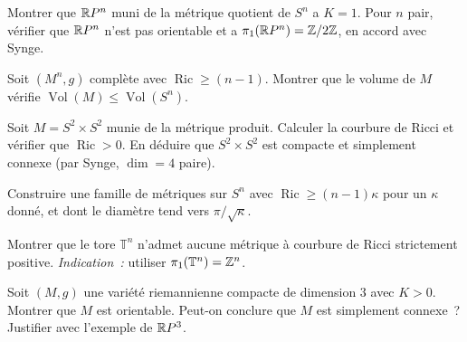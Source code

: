 \begin{exercice}
Montrer que $\mathbb{R} P^n$ muni de la m\'etrique quotient de $S^n$ a $K = 1$. Pour $n$
pair, v\'erifier que $\mathbb{R} P^n$ n'est pas orientable et a $\pi_1(\mathbb{R} P^n) = \mathbb{Z}/2\mathbb{Z}$,
en accord avec Synge.
\end{exercice}

\begin{exercice}
Soit $(M^n, g)$ compl\`ete avec $\operatorname{Ric} \geq (n-1)$. Montrer que
le volume de $M$ v\'erifie $\operatorname{Vol}(M) \leq \operatorname{Vol}(S^n)$.
\end{exercice}

\begin{exercice}
Soit $M = S^2 \times S^2$ munie de la m\'etrique produit. Calculer la courbure de
Ricci et v\'erifier que $\operatorname{Ric} > 0$. En d\'eduire que $S^2 \times S^2$
est compacte et simplement connexe (par Synge, $\dim = 4$ paire).
\end{exercice}

\begin{exercice}
Construire une famille de m\'etriques sur $S^n$ avec $\operatorname{Ric} \geq (n-1)\kappa$
pour un $\kappa$ donn\'e, et dont le diam\`etre tend vers $\pi/\sqrt{\kappa}$.
\end{exercice}

\begin{exercice}
Montrer que le tore $\mathbb{T}^n$ n'admet aucune m\'etrique \`a courbure de Ricci
strictement positive. \emph{Indication~:} utiliser $\pi_1(\mathbb{T}^n) = \mathbb{Z}^n$.
\end{exercice}

\begin{exercice}
Soit $(M, g)$ une vari\'et\'e riemannienne compacte de dimension $3$ avec $K > 0$.
Montrer que $M$ est orientable. Peut-on conclure que $M$ est simplement connexe~?
Justifier avec l'exemple de $\mathbb{R} P^3$.
\end{exercice}
